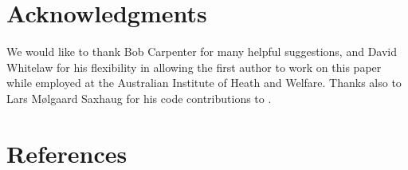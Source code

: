 \hypertarget{acknowledgments}{%
\section{Acknowledgments}\label{acknowledgments}}

We would like to thank Bob Carpenter for many helpful suggestions, and David
Whitelaw for his flexibility in allowing the first author to work on this paper
while employed at the Australian Institute of Heath and Welfare. Thanks also
to Lars Mølgaard Saxhaug for his code contributions to .

\hypertarget{references}{%
\section*{References}\label{references}}

